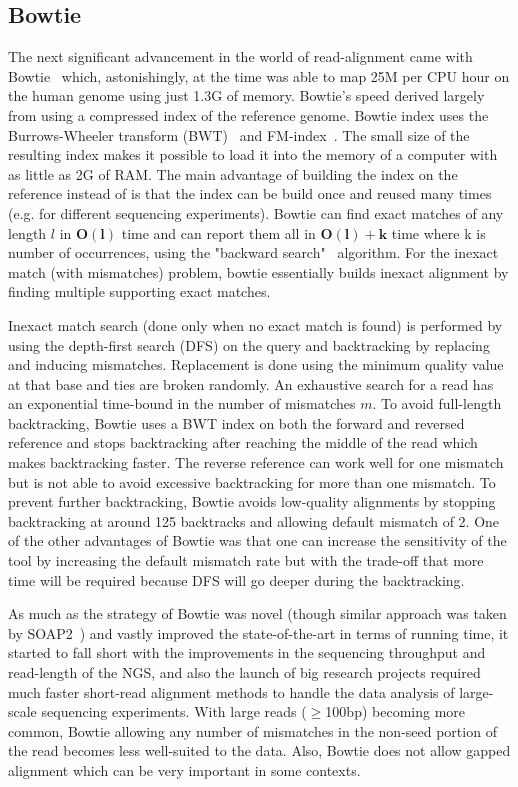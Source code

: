 \subsection{Bowtie~\citep{bowtie}} \label{bowtie}
The next significant advancement in the world of read-alignment came with Bowtie~\citep{bowtie} which, astonishingly, at the time was able to map 25M \reads per CPU hour on the human genome using just 1.3G of memory. Bowtie's speed derived largely from using a compressed index of the reference genome. Bowtie index uses the Burrows-Wheeler transform (BWT)~\citep{burrows1994block} and FM-index~\citep{ferragina2000opportunistic, ferragina2001experimental}. The small size of the resulting index makes it possible to load it into the memory of a computer with as little as 2G of RAM. The main advantage of building the index on the reference instead of \reads is that the index can be build once and reused many times (e.g. for different sequencing experiments). Bowtie can find exact matches of any length $l$ in $\bm{O(l)}$ time and can report them all in $\bm{O(l) + k}$ time where k is number of occurrences, using the "backward search"~\citep{ferragina2000opportunistic} algorithm. For the inexact match (with mismatches) problem, bowtie essentially builds inexact alignment by finding multiple supporting exact matches.

Inexact match search (done only when no exact match is found) is performed by using the depth-first search (DFS) on the query and backtracking by replacing and inducing mismatches. Replacement is done using the minimum quality value at that base and ties are broken randomly. An exhaustive search for a read has an exponential time-bound in the number of mismatches $m$. To avoid full-length backtracking, Bowtie uses a BWT index on both the forward and reversed reference and stops backtracking after reaching the middle of the read which makes backtracking faster. The reverse reference can work well for one mismatch but is not able to avoid excessive backtracking for more than one mismatch. To prevent further backtracking, Bowtie avoids low-quality alignments by stopping backtracking at around 125 backtracks and allowing default mismatch of 2. One of the other advantages of Bowtie was that one can increase the sensitivity of the tool by increasing the default mismatch rate but with the trade-off that more time will be required because DFS will go deeper during the backtracking. 

As much as the strategy of Bowtie was novel (though similar approach was taken by SOAP2~\citep{li2009soap2}) and vastly improved the state-of-the-art in terms of running time, it started to fall short with the improvements in the sequencing throughput and read-length of the NGS, and also the launch of big research projects required much faster short-read alignment methods to handle the data analysis of large-scale sequencing experiments. With large reads ($\geq$100bp) becoming more common, Bowtie allowing any number of mismatches in the non-seed portion of the read becomes less well-suited to the data. Also, Bowtie does not allow gapped alignment which can be very important in some contexts.

